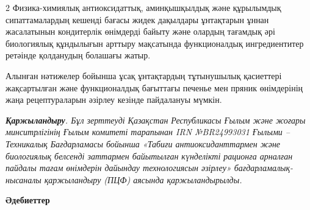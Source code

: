 \begin{multicols}{2}
Физика-химиялық антиоксидаттық, аминқышқылдық және құрылымдық
сипаттамалардың кешенді бағасы жидек дақылдары ұнтақтарын ұннан
жасалатынын кондитерлік өнімдерді байыту және олардың тағамдық әрі
биологиялық құндылығын арттыру мақсатында функционалдық ингредиентитер
ретәінде қолданудың болашағы жатыр.

Алынған нәтижелер бойынша ұсақ ұнтақтардың тұтынушылық қасиеттері
жақсартылған және функционалдық бағыттағы печенье мен пряник өнімдерінің
жаңа рецептураларын әзірлеу кезінде пайдалануы мүмкін.

\emph{{\bfseries Қаржыландыру}. Бұл зерттеуді Қазақстан Республикасы Ғылым
және жоғары минситрлігінің Ғылым комитеті тарапынан IRN №BR24993031
Ғылыми -- Техникалық Бағдарламасы бойынша «Табиғи антиоксиданттармен
және биологиялық белсенді заттармен байытылған күнделікті рационға
арналған пайдалы тағам өнімдерін дайындау технологиясын әзірлеу»
бағдарламалық-нысаналы қаржыландыру (ПЦФ) аясында қаржыландырылды.}
\end{multicols}

\begin{center}
{\bfseries Әдебиеттер}
\end{center}

